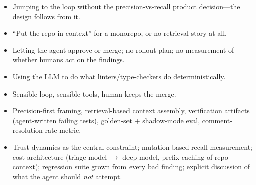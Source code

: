 \begin{interviewq}
\redflags
\begin{itemize}
    \item Jumping to the loop without the precision-vs-recall product decision---the design follows from it.
    \item ``Put the repo in context'' for a monorepo, or no retrieval story at all.
    \item Letting the agent approve or merge; no rollout plan; no measurement of whether humans act on the findings.
    \item Using the LLM to do what linters/type-checkers do deterministically.
\end{itemize}


\goodgreat
\begin{itemize}
    \item {} Sensible loop, sensible tools, human keeps the merge.
    \item {} Precision-first framing, retrieval-based context assembly, verification artifacts (agent-written failing tests), golden-set + shadow-mode eval, comment-resolution-rate metric.
    \item {} Trust dynamics as the central constraint; mutation-based recall measurement; cost architecture (triage model $\rightarrow$ deep model, prefix caching of repo context); regression suite grown from every bad finding; explicit discussion of what the agent should \textit{not} attempt.
\end{itemize}

\end{interviewq}


